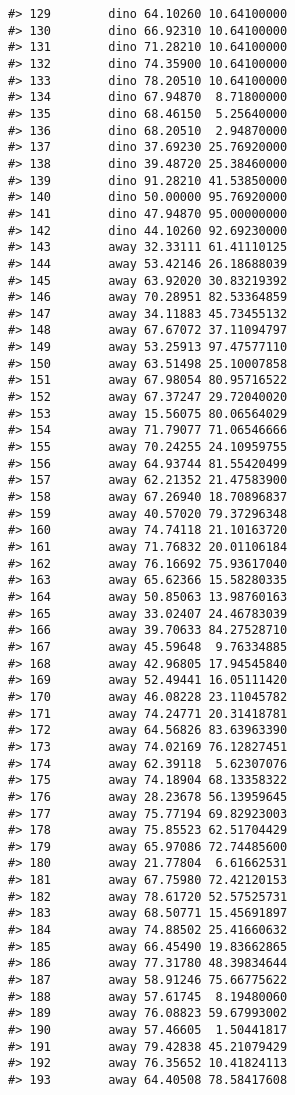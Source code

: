 \documentclass[
]{book}
\theoremstyle{definition}
\theoremstyle{definition}
\theoremstyle{definition}
\theoremstyle{definition}
\theoremstyle{remark}
\begin{document}
\begin{verbatim}
#> 129        dino 64.10260 10.64100000
#> 130        dino 66.92310 10.64100000
#> 131        dino 71.28210 10.64100000
#> 132        dino 74.35900 10.64100000
#> 133        dino 78.20510 10.64100000
#> 134        dino 67.94870  8.71800000
#> 135        dino 68.46150  5.25640000
#> 136        dino 68.20510  2.94870000
#> 137        dino 37.69230 25.76920000
#> 138        dino 39.48720 25.38460000
#> 139        dino 91.28210 41.53850000
#> 140        dino 50.00000 95.76920000
#> 141        dino 47.94870 95.00000000
#> 142        dino 44.10260 92.69230000
#> 143        away 32.33111 61.41110125
#> 144        away 53.42146 26.18688039
#> 145        away 63.92020 30.83219392
#> 146        away 70.28951 82.53364859
#> 147        away 34.11883 45.73455132
#> 148        away 67.67072 37.11094797
#> 149        away 53.25913 97.47577110
#> 150        away 63.51498 25.10007858
#> 151        away 67.98054 80.95716522
#> 152        away 67.37247 29.72040020
#> 153        away 15.56075 80.06564029
#> 154        away 71.79077 71.06546666
#> 155        away 70.24255 24.10959755
#> 156        away 64.93744 81.55420499
#> 157        away 62.21352 21.47583900
#> 158        away 67.26940 18.70896837
#> 159        away 40.57020 79.37296348
#> 160        away 74.74118 21.10163720
#> 161        away 71.76832 20.01106184
#> 162        away 76.16692 75.93617040
#> 163        away 65.62366 15.58280335
#> 164        away 50.85063 13.98760163
#> 165        away 33.02407 24.46783039
#> 166        away 39.70633 84.27528710
#> 167        away 45.59648  9.76334885
#> 168        away 42.96805 17.94545840
#> 169        away 52.49441 16.05111420
#> 170        away 46.08228 23.11045782
#> 171        away 74.24771 20.31418781
#> 172        away 64.56826 83.63963390
#> 173        away 74.02169 76.12827451
#> 174        away 62.39118  5.62307076
#> 175        away 74.18904 68.13358322
#> 176        away 28.23678 56.13959645
#> 177        away 75.77194 69.82923003
#> 178        away 75.85523 62.51704429
#> 179        away 65.97086 72.74485600
#> 180        away 21.77804  6.61662531
#> 181        away 67.75980 72.42120153
#> 182        away 78.61720 52.57525731
#> 183        away 68.50771 15.45691897
#> 184        away 74.88502 25.41660632
#> 185        away 66.45490 19.83662865
#> 186        away 77.31780 48.39834644
#> 187        away 58.91246 75.66775622
#> 188        away 57.61745  8.19480060
#> 189        away 76.08823 59.67993002
#> 190        away 57.46605  1.50441817
#> 191        away 79.42838 45.21079429
#> 192        away 76.35652 10.41824113
#> 193        away 64.40508 78.58417608

\end{verbatim}
\end{document}

